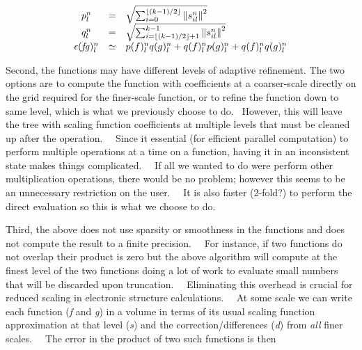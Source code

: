 \documentclass[letterpaper]{article}
\begin{document}
\begin{equation}
\begin{matrix}p_{l}^{n}&\text{=}&\sqrt{\sum _{i=0}^{\left\lfloor
(k-1)/2\right\rfloor}\left\|s_{il}^{n}\right\|^{2}}\hfill\null \\q_{l}^{n}&\text{=}&\sqrt{\sum _{i=\left\lfloor
(k-1)/2\right\rfloor+1}^{k-1}\left\|s_{il}^{n}\right\|^{2}}\hfill\null \\\epsilon (\mathit{fg})_{l}^{n}&\simeq
&p(f)_{l}^{n}q(g)_{l}^{n}+q(f)_{l}^{n}p(g)_{l}^{n}+q(f)_{l}^{n}q(g)_{l}^{n}\end{matrix}
\end{equation}

\bigskip

Second, the functions may have different levels of adaptive refinement. The two options are to compute the function with
coefficients at a coarser-scale directly on the grid required for the finer-scale function, or to refine the function
down to same level, which is what we previously choose to do. \ However, this will leave the tree with scaling function
coefficients at multiple levels that must be cleaned up after the operation. \ \ Since it essential (for efficient
parallel computation) to perform multiple operations at a time on a function, having it in an inconsistent state makes
things complicated. \ \ If all we wanted to do were perform other multiplication operations, there would be no problem;
however this seems to be an unnecessary restriction on the user. \ \ It is also faster (2-fold?) to perform the direct
evaluation so this is what we choose to do. \ 

Third, the above does not use sparsity or smoothness in the functions and does not compute the result to a finite
precision. \ \ For instance, if two functions do not overlap their product is zero but the above algorithm will compute
at the finest level of the two functions doing a lot of work to evaluate small numbers that will be discarded upon
truncation. \ \ Eliminating this overhead is crucial for reduced scaling in electronic structure calculations. \ \ At
some scale we can write each function (\textit{f} and \textit{g}) in a volume in terms of its usual scaling function
approximation at that level (\textit{s}) and the correction/differences (\textit{d}) from \textit{all }finer scales.
\ \ The error in the product of two such functions is then 
\end{document}
